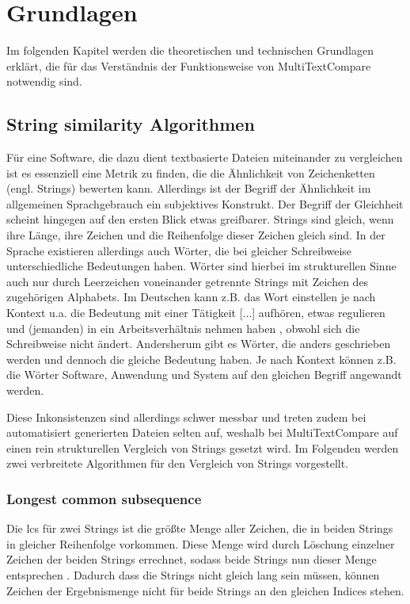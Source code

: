 \section{Grundlagen}
Im folgenden Kapitel werden die theoretischen und technischen Grundlagen erklärt, die für das Verständnis der Funktionsweise von MultiTextCompare notwendig sind.

\subsection{String similarity Algorithmen}\label{String similarity Algorithmen}
Für eine Software, die dazu dient textbasierte Dateien miteinander zu vergleichen ist es essenziell eine Metrik zu finden, die die Ähnlichkeit von Zeichenketten (engl. Strings) bewerten kann. Allerdings ist der Begriff der Ähnlichkeit im allgemeinen Sprachgebrauch ein subjektives Konstrukt. Der Begriff der Gleichheit scheint hingegen auf den ersten Blick etwas greifbarer.
Strings sind gleich, wenn ihre Länge, ihre Zeichen und die Reihenfolge dieser Zeichen gleich sind. In der Sprache existieren allerdings auch Wörter, die bei gleicher Schreibweise unterschiedliche Bedeutungen haben. Wörter sind hierbei im strukturellen Sinne auch nur durch Leerzeichen voneinander getrennte Strings mit Zeichen des zugehörigen Alphabets. Im Deutschen kann z.B. das Wort \glqq einstellen\grqq{} je nach Kontext u.a. die Bedeutung \glqq mit einer Tätigkeit [...] aufhören\grqq{}, \glqq etwas regulieren\grqq{}  und \glqq (jemanden) in ein Arbeitsverhältnis nehmen \grqq{} haben \autocite{dudenEinstellen}, obwohl sich die Schreibweise nicht ändert. Andersherum gibt es Wörter, die anders geschrieben werden und dennoch die gleiche Bedeutung haben. Je nach Kontext können z.B. die Wörter Software, Anwendung und System auf den gleichen Begriff angewandt werden.

Diese Inkonsistenzen sind allerdings schwer messbar und treten zudem bei automatisiert generierten Dateien selten auf, weshalb bei MultiTextCompare auf einen rein strukturellen Vergleich von Strings gesetzt wird. Im Folgenden werden zwei verbreitete Algorithmen für den Vergleich von Strings vorgestellt.

\subsubsection{Longest common subsequence}\label{lcs}

Die \acrfull{lcs} für zwei Strings ist die größte Menge aller Zeichen, die in beiden Strings in gleicher Reihenfolge vorkommen. Diese Menge wird durch Löschung einzelner Zeichen der beiden Strings errechnet, sodass beide Strings nun dieser Menge entsprechen \autocite[]{lcsFirstArticle}. Dadurch dass die Strings nicht gleich lang sein müssen, können Zeichen der Ergebnismenge nicht für beide Strings an den gleichen Indices stehen.


